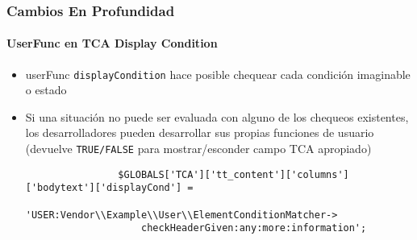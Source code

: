 \begin{frame}[fragile]
	\frametitle{Cambios En Profundidad}
	\framesubtitle{UserFunc en TCA Display Condition}

	\begin{itemize}
		\item userFunc \texttt{displayCondition} hace posible chequear cada condición imaginable o estado
		\item Si una situación no puede ser evaluada con alguno de los chequeos existentes, los desarrolladores
			pueden desarrollar sus propias funciones de usuario\newline
			(devuelve \texttt{TRUE/FALSE} para mostrar/esconder campo TCA apropiado)

			\begin{lstlisting}
				$GLOBALS['TCA']['tt_content']['columns']['bodytext']['displayCond'] =
				  'USER:Vendor\\Example\\User\\ElementConditionMatcher->
				    checkHeaderGiven:any:more:information';
			\end{lstlisting}

	\end{itemize}

\end{frame}


